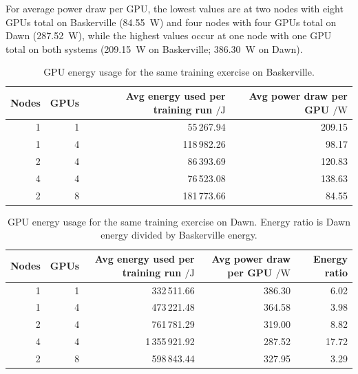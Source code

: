 For average power draw per GPU, the lowest values are at two nodes with eight GPUs total on Baskerville (\qty{84.55}{\watt}) and four nodes with four GPUs total on Dawn (\qty{287.52}{\watt}), while the highest values occur at one node with one GPU total on both systems (\qty{209.15}{\watt} on Baskerville; \qty{386.30}{\watt} on Dawn).

\begin{table}[t] %
    \centering
    \begin{tabular}{@{}rrrr@{}}
      \toprule
      Nodes
      & GPUs
      & \shortstack[r]{Avg energy used\\ per training run ${}/\unit{\joule}$}
      & \shortstack[r]{Avg power draw\\ per GPU ${}/\unit{\watt}$} \\ \midrule
        1 & 1 & 55\,267.94 & 209.15 \\
        1 & 4 & 118\,982.26 & 98.17 \\
        2 & 4 & 86\,393.69 & 120.83 \\
        4 & 4 & 76\,523.08 & 138.63 \\
        2 & 8 & 181\,773.66 & 84.55 \\ \bottomrule
    \end{tabular}
    \caption{GPU energy usage for the same training exercise on Baskerville.}
    \label{tab:energy-bask}
\end{table}

\begin{table}[t] %
    \centering
 \begin{tabular}{@{}rrrrr@{}}
      \toprule
      Nodes
      & GPUs
      & \shortstack[r]{Avg energy used\\ per training run ${}/\unit{\joule}$}
      & \shortstack[r]{Avg power draw\\ per GPU ${}/\unit{\watt}$}
      & Energy ratio \\ \midrule
        1 & 1 & 332\,511.66 & 386.30 & 6.02 \\
        1 & 4 & 473\,221.48 & 364.58 & 3.98 \\
        2 & 4 & 761\,781.29 & 319.00 & 8.82 \\
        4 & 4 & 1\,355\,921.92 & 287.52 & 17.72 \\
        2 & 8 & 598\,843.44 & 327.95 & 3.29 \\ \bottomrule
    \end{tabular}
    \caption{GPU energy usage for the same training exercise on Dawn. Energy ratio is Dawn energy divided by Baskerville energy.}
    \label{tab:energy-dawn}
\end{table}

